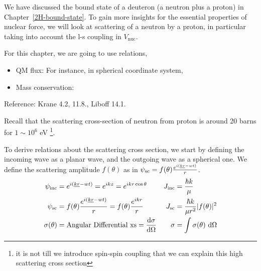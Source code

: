 \documentclass{school-22.101-notes}
\date{October 24, 2011}
\begin{document}
\maketitle

We have discussed the bound state of a deuteron (a neutron plus a proton) in Chapter~\ref{2H-bound-state}. To gain more insights for the essential properties of nuclear force, we will look at scattering of a neutron by a proton, in particular taking into account the l-s coupling in $V_{\mathrm{nuc}}$. 


For this chapter, we are going to use relations, 
\begin{itemize}
\item QM flux: 
  For instance, in spherical coordinate system, 
\item Mass conservation: 
\end{itemize}


Reference: Krane 4.2, 11.8., Liboff 14.1.






Recall that the scattering cross-section of neutron from proton is around 20 barns for $1 \sim 10^6$ eV \footnote{it is not till we introduce spin-spin coupling that we can explain this high scattering cross section}. 

To derive relations about the scattering cross section, we start by defining the incoming wave as a planar wave, and the outgoing wave as a spherical one. We define the scattering amplitude $f(\theta)$ as in $\psi_{\mathrm{sc}} = f(\theta) \frac{e^{i (\underline{k} \underline{r} - wt)}}{r}$. 
\begin{align}
\psi_{\mathrm{inc}} &= e^{i (\underline{k} \underline{r} - wt)} = e^{ikz}  = e^{ikr \cos \theta} 
&J_{\mathrm{inc}} &= \frac{\hbar k}{\mu} \\
\psi_{\mathrm{sc}} &=  f(\theta) \frac{e^{i (\underline{k} \underline{r} - wt)}}{r} = f(\theta) \frac{e^{ikr}}{r} &J_{\mathrm{sc}} &= \frac{\hbar k}{\mu r^2} |f(\theta)|^2 \\
\sigma(\theta) &= \mbox{Angular Differential xs} = \frac{\mathrm{d}\sigma}{\mathrm{d}\Omega}  &\sigma &= \int \sigma(\theta) \mbox{ }\mathrm{d} \Omega
\end{align}
\end{document}
